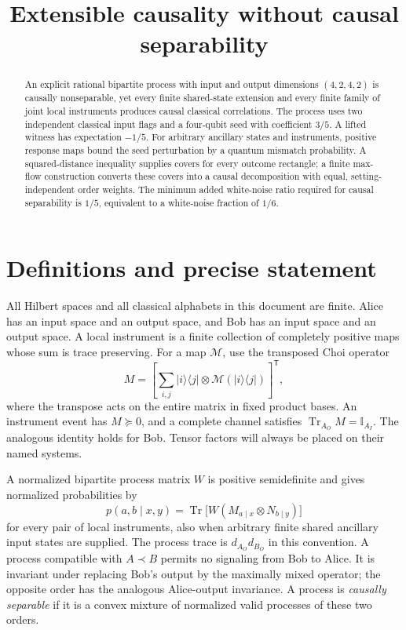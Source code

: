 \documentclass[11pt,letterpaper]{article}
\title{Extensible causality without causal separability}
\author{}
\date{}
\theoremstyle{remark}\newtheorem{remark}[theorem]{Remark}
\newcommand{\Tr}{\operatorname{Tr}}
\newcommand{\I}{\mathbb I}
\newcommand{\ket}[1]{\lvert#1\rangle}
\newcommand{\bra}[1]{\langle#1\rvert}
\begin{document}
\maketitle
\vspace{-1.5em}
\begin{abstract}
An explicit rational bipartite process with input and output dimensions $(4,2,4,2)$ is causally nonseparable, yet every finite shared-state extension and every finite family of joint local instruments produces causal classical correlations. The process uses two independent classical input flags and a four-qubit seed with coefficient $3/5$. A lifted witness has expectation $-1/5$. For arbitrary ancillary states and instruments, positive response maps bound the seed perturbation by a quantum mismatch probability. A squared-distance inequality supplies covers for every outcome rectangle; a finite max-flow construction converts these covers into a causal decomposition with equal, setting-independent order weights. The minimum added white-noise ratio required for causal separability is $1/5$, equivalent to a white-noise fraction of $1/6$.
\end{abstract}

\section{Definitions and precise statement}

All Hilbert spaces and all classical alphabets in this document are finite. Alice has an input space and an output space, and Bob has an input space and an output space. A local instrument is a finite collection of completely positive maps whose sum is trace preserving. For a map $\mathcal M$, use the transposed Choi operator
\[
 M=\left[\sum_{i,j}\ket i\bra j\otimes\mathcal M(\ket i\bra j)\right]^{\mathsf T},
\]
where the transpose acts on the entire matrix in fixed product bases. An instrument event has $M\succeq0$, and a complete channel satisfies $\Tr_{A_O}M=\I_{A_I}$. The analogous identity holds for Bob. Tensor factors will always be placed on their named systems.

A normalized bipartite process matrix $W$ is positive semidefinite and gives normalized probabilities by
\begin{equation}\label{eq:born}
 p(a,b\mid x,y)=\Tr\bigl[W(M_{a\mid x}\otimes N_{b\mid y})\bigr]
\end{equation}
for every pair of local instruments, also when arbitrary finite shared ancillary input states are supplied. The process trace is $d_{A_O}d_{B_O}$ in this convention. A process compatible with $A\prec B$ permits no signaling from Bob to Alice. It is invariant under replacing Bob's output by the maximally mixed operator; the opposite order has the analogous Alice-output invariance. A process is \emph{causally separable} if it is a convex mixture of normalized valid processes of these two orders.
\end{document}
